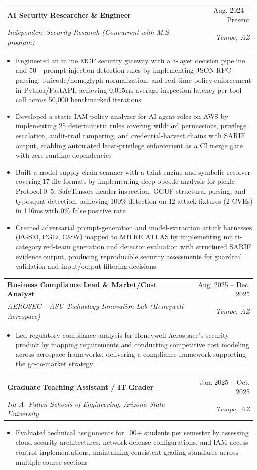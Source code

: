 \documentclass[letterpaper,11pt]{article}
\makeatletter
\newcommand{\resumeItem}[1]{
  \item\small{
    {#1 \vspace{-2pt}}
  }
}
\newcommand{\resumeSubheading}[4]{
  \vspace{-2pt}\item
    \begin{tabular*}{0.97\textwidth}[t]{l@{\extracolsep{\fill}}r}
      \textbf{#1} & #2 \\
      \textit{\small#3} & \textit{\small #4} \\
    \end{tabular*}\vspace{-7pt}
}
\newcommand{\resumeItemListStart}{\begin{itemize}}
\newcommand{\resumeItemListEnd}{\end{itemize}\vspace{-5pt}}
\makeatother
\begin{document}
    \resumeSubheading
      {AI Security Researcher \& Engineer}{Aug. 2024 -- Present}
      {Independent Security Research (Concurrent with M.S. program)}{Tempe, AZ}
      \resumeItemListStart
        \resumeItem{Engineered an inline MCP security gateway with a 5-layer decision pipeline and 50+ prompt-injection detection rules by implementing JSON-RPC parsing, Unicode/homoglyph normalization, and real-time policy enforcement in Python/FastAPI, achieving 0.015ms average inspection latency per tool call across 50,000 benchmarked iterations}
        \resumeItem{Developed a static IAM policy analyzer for AI agent roles on AWS by implementing 25 deterministic rules covering wildcard permissions, privilege escalation, audit-trail tampering, and credential-harvest chains with SARIF output, enabling automated least-privilege enforcement as a CI merge gate with zero runtime dependencies}
        \resumeItem{Built a model supply-chain scanner with a taint engine and symbolic resolver covering 17 file formats by implementing deep opcode analysis for pickle Protocol 0--5, SafeTensors header inspection, GGUF structural parsing, and typosquat detection, achieving 100\% detection on 12 attack fixtures (2 CVEs) in 116ms with 0\% false positive rate}
        \resumeItem{Created adversarial prompt-generation and model-extraction attack harnesses (FGSM, PGD, C\&W) mapped to MITRE ATLAS by implementing multi-category red-team generation and detector evaluation with structured SARIF evidence output, producing reproducible security assessments for guardrail validation and input/output filtering decisions}
      \resumeItemListEnd

    \resumeSubheading
      {Business Compliance Lead \& Market/Cost Analyst}{Aug. 2025 -- Dec. 2025}
      {AEROSEC -- ASU Technology Innovation Lab (Honeywell Aerospace)}{Tempe, AZ}
      \resumeItemListStart
        \resumeItem{Led regulatory compliance analysis for Honeywell Aerospace's security product by mapping requirements and conducting competitive cost modeling across aerospace frameworks, delivering a compliance framework supporting the go-to-market strategy}
      \resumeItemListEnd

    \resumeSubheading
      {Graduate Teaching Assistant / IT Grader}{Jan. 2025 -- Oct. 2025}
      {Ira A. Fulton Schools of Engineering, Arizona State University}{Tempe, AZ}
      \resumeItemListStart
        \resumeItem{Evaluated technical assignments for 100+ students per semester by assessing cloud security architectures, network defense configurations, and IAM access control implementations, maintaining consistent grading standards across multiple course sections}
      \resumeItemListEnd
\end{document}
